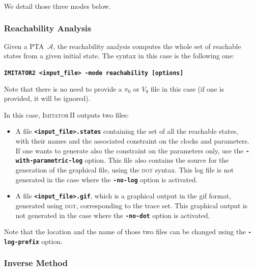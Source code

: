 \documentclass[a4paper,10pt]{article}
\newcommand{\A}{\mathcal{A}}
\newcommand{\gdot}{\textsc{dot}}
\newcommand{\imitatordeux}{\textsc{Imitator}\,II}
\newcommand{\imitatordeuxExec}{\code{IMITATOR2}}
\newcommand{\code}[1]{\textbf{\texttt{#1}}}
\begin{document}
We detail those three modes below.



\subsubsection{Reachability Analysis} \label{ss:mode_reachability}

Given a PTA~$\A$, the reachability analysis computes the whole set of reachable states from a given initial state.
The syntax in this case is the following one:

\code{\imitatordeuxExec{} <input\_file> -mode reachability [options]}

Note that there is no need to provide a $\pi_0$ or $V_0$ file in this case (if one is provided, it will be ignored).

In this case, \imitatordeux{} outputs two files:

\begin{itemize}
	\item A file \code{<input\_file>.states} containing the set of all the reachable states, with their names and the associated constraint on the clocks and parameters.
	If one wants to generate also the constraint on the parameters only, use the \code{-with-parametric-log} option.
	This file also contains the source for the generation of the graphical file, using the \gdot{} syntax.
	This log file is not generated in the case where the \code{-no-log} option is activated.
	
	\item A file \code{<input\_file>.gif}, which is a graphical output in the gif format, generated using \gdot{}, corresponding to the trace set.
	This graphical output is not generated in the case where the \code{-no-dot} option is activated.
\end{itemize}

Note that the location and the name of those two files can be changed using the \code{-log-prefix} option.



\subsubsection{Inverse Method} \label{ss:mode_inversemethod}
\end{document}
